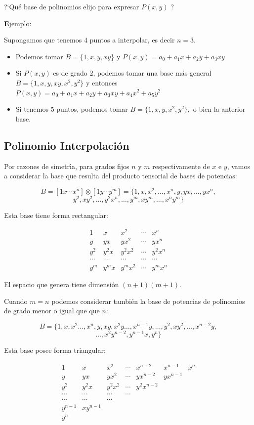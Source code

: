 \documentclass[ebook,oneside]{memoir}
\begin{document}
?`Qu\'{e} base de polinomios elijo para expresar $P(x,y)$ ?

{\textbf Ejemplo:}

Supongamos que tenemos $4$ puntos a interpolar, es decir $n=3$.

\begin{itemize}
\item Podemos tomar $B=\{1,x,y,xy\}$ y $P(x,y)=a_0+a_1x+a_2y+a_3xy$
\item Si $P(x,y)$ es de grado $2$, podemos tomar una base m\'{a}s general $B=\{1,x,y,xy,x^2,y^2\}$ y entonces $P(x,y)=a_0+a_1x+a_2y+a_3xy+a_4x^2+a_5y^2$
\item Si tenemos $5$ puntos, podemos tomar $B=\{1,x,y,x^2,y^2\},$ o bien la anterior base.
\end{itemize}

\subsection{Polinomio Interpolaci\'{o}n}

Por razones de simetr\'{\i}a, para grados fijos $n$ y $m$ respectivamente de $x$ e $y$, vamos a considerar la base que resulta del producto tensorial de bases de potencias:

$$B=[1 x \cdots x^n]\otimes[1 y \cdots y^m]=\{1,x,x^2, \ldots, x^n, y, yx, \ldots,yx^n, $$ $$y^2, xy^2, \ldots, y^2x^n, \ldots,y^m,xy^m, \ldots,x^ny^m\}$$

Esta base tiene forma rectangular:

$$\begin{array}{ccccc}
1 & x & x^2& \cdots & x^n\\
y & yx& yx^2 & \cdots& y x^n\\
y^2 & y^2x& y^2x^2 & \cdots& y^2 x^n\\
\cdots & \cdots& \cdots&\cdots&\cdots\\
y^m & y^mx& y^mx^2 & \cdots& y^m x^n
\end{array}$$

El espacio que genera tiene dimensi\'{o}n $(n+1)(m+1)$.

Cuando $m=n$ podemos considerar tambi\'{e}n la  base de potencias de polinomios de grado menor o igual que que $n$:

$$B=\{1,x,x^2\ldots,x^n, y, xy, x^2y \ldots,x^{n-1}y,\ldots, y^2, xy^2,\ldots, x^{n-2}y,$$ $$\ldots, x^2y^{n-2}, y^{n-1}x,y^n \}$$

Esta base posee forma triangular:

$$\begin{array}{ccccccc}
1 & x & x^2& \cdots &x^{n-2}&x^{n-1}& x^n\\
y & yx& yx^2 & \cdots& yx^{n-2}& y x^{n-1} & \\
y^2 & y^2x& y^2x^2 & \cdots& y^2 x^{n-2} & & \\
\cdots & \cdots& \cdots&\cdots&& &  \\
\cdots & \cdots& \cdots& & & & \\
 y^{n-1} & xy^{n-1} &  & & & &\\
 y^n & & & & & &
\end{array}$$
\end{document}
